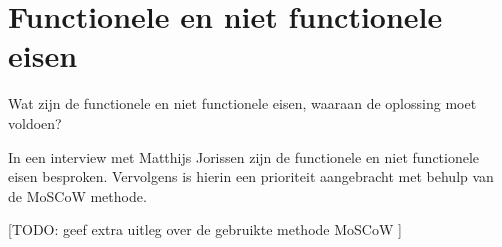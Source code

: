 \section{Functionele en niet functionele eisen}
\label{sec:deelvraag1}

Wat zijn de functionele en niet functionele eisen, waaraan de oplossing moet voldoen?

In een interview met Matthijs Jorissen zijn de functionele en niet functionele eisen besproken. Vervolgens is hierin een prioriteit aangebracht met behulp van de MoSCoW methode. 

[TODO: geef extra uitleg over de gebruikte methode MoSCoW \cite{ma2009effectiveness}]

\begin{comment}
Een functionele eis kan gezien worden als iets dat de gebruiker nodig heeft om het doel te bereiken of een bepaalde voorwaarde waaraan de oplossing moet voldoen.

Een non functionele eis is een beperking doe wordt opgelegd op een mogelijke oplossing, met het doel om functionele eisen te behalen of het doel van het project.
\end{comment}

